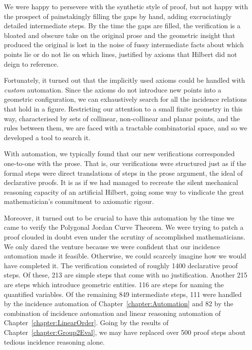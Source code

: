 We were happy to persevere with the synthetic style of proof, but not happy with the prospect of painstakingly filling the gaps by hand, adding excruciatingly detailed intermediate steps. By the time the gaps are filled, the verification is a bloated and obscure take on the original prose and the geometric insight that produced the original is lost in the noise of fussy intermediate facts about which points lie or do not lie on which lines, justified by axioms that Hilbert did not deign to reference. 

Fortunately, it turned out that the implicitly used axioms could be handled with \emph{custom} automation. Since the axioms do not introduce new points into a geometric configuration, we can exhaustively search for all the incidence relations that hold in a figure. Restricting our attention to a small finite geometry in this way, characterised by sets of collinear, non-collinear and planar points, and the rules between them, we are faced with a tractable combinatorial space, and so we developed a tool to search it.

With  automation, we typically found that our new verifications corresponded one-to-one with the prose. That is, our verifications were structured just as if the formal steps were direct translations of steps in the prose argument, the ideal of declarative proofs. It is as if we had managed to recreate the silent mechanical reasoning capacity of an artificial Hilbert, going some way to vindicate the great mathematician's commitment to axiomatic rigour.

Moreover, it turned out to be crucial to have this automation by the time we came to verify the Polygonal Jordan Curve Theorem. We were trying to patch a proof clouded in doubt even under the scrutiny of accomplished mathematicians. We only dared the venture because we were confident that our incidence automation made it feasible. Otherwise, we could scarcely imagine how we would have completed it. The verification consisted of roughly 1400 declarative proof steps. Of these, 213 are simple  steps that come with no justification. Another 215 are  steps which introduce geometric entities. 116 are  steps for naming the quantified variables. Of the remaining 849 intermediate steps, 111 were handled by the incidence automation of Chapter~\ref{chapter:Automation} and 82 by the combination of incidence automation and linear reasoning automation of Chapter~\ref{chapter:LinearOrder}. Going by the results of Chapter~\ref{chapter:Group2Eval}, we may have replaced over 500 proof steps about tedious incidence reasoning alone.

